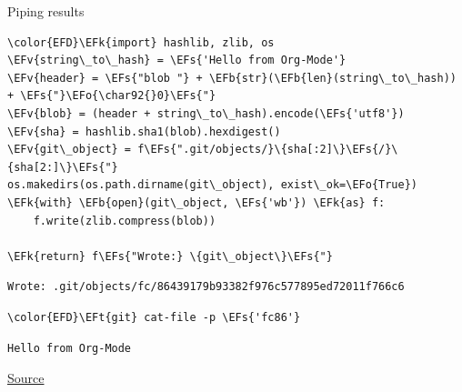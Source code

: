\documentclass[presentation, t]{beamer}
\newcommand{\EFs}[1]{\textcolor{EFs}{#1}} %
\newcommand{\EFk}[1]{\textcolor{EFk}{#1}} %
\newcommand{\EFb}[1]{\textcolor{EFb}{#1}} %
\newcommand{\EFv}[1]{\textcolor{EFv}{#1}} %
\newcommand{\EFt}[1]{\textcolor{EFt}{#1}} %
\newcommand{\EFo}[1]{\textcolor{EFo}{#1}} %
\begin{document}
\begin{frame}[label={sec:org2007ce1},fragile]{Piping results}
 \tiny

\begin{Code}
\begin{Verbatim}
\color{EFD}\EFk{import} hashlib, zlib, os
\EFv{string\_to\_hash} = \EFs{'Hello from Org-Mode'}
\EFv{header} = \EFs{"blob "} + \EFb{str}(\EFb{len}(string\_to\_hash)) + \EFs{"}\EFo{\char92{}0}\EFs{"}
\EFv{blob} = (header + string\_to\_hash).encode(\EFs{'utf8'})
\EFv{sha} = hashlib.sha1(blob).hexdigest()
\EFv{git\_object} = f\EFs{".git/objects/}\{sha[:2]\}\EFs{/}\{sha[2:]\}\EFs{"}
os.makedirs(os.path.dirname(git\_object), exist\_ok=\EFo{True})
\EFk{with} \EFb{open}(git\_object, \EFs{'wb'}) \EFk{as} f:
    f.write(zlib.compress(blob))

\EFk{return} f\EFs{"Wrote:} \{git\_object\}\EFs{"}
\end{Verbatim}
\end{Code}

\begin{verbatim}
Wrote: .git/objects/fc/86439179b93382f976c577895ed72011f766c6
\end{verbatim}


\begin{Code}
\begin{Verbatim}
\color{EFD}\EFt{git} cat-file -p \EFs{'fc86'}
\end{Verbatim}
\end{Code}

\begin{verbatim}
Hello from Org-Mode
\end{verbatim}


\href{https://www.youtube.com/watch?v=0g9BcZvQbXU}{Source}
\end{frame}
\end{document}
